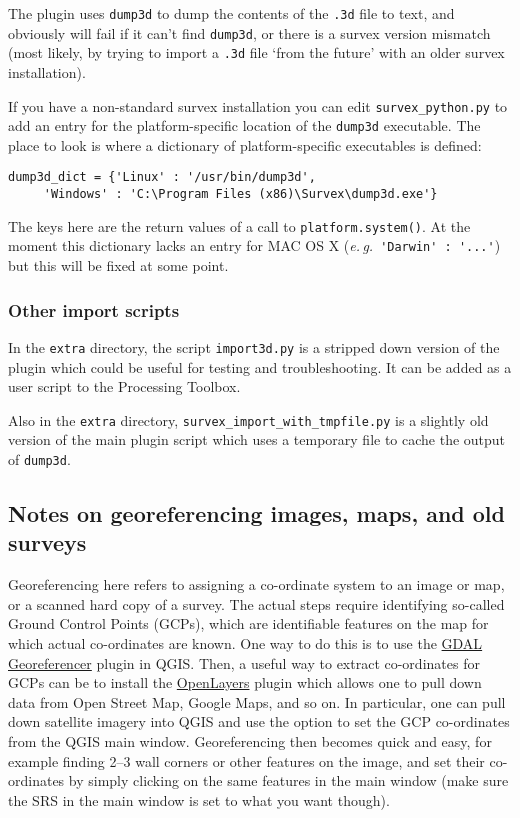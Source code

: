 \documentclass[]{article}
\newcommand{\latin}[1]{\emph{#1}}
\newcommand{\eg}{\latin{e.\,g.}}
\begin{document}
The plugin uses \verb}dump3d} to dump the contents of the \verb}.3d}
file to text, and obviously will fail if it can't find \verb}dump3d},
or there is a survex version mismatch (most likely, by trying to import
a \verb}.3d} file `from the future' with an older survex
installation).

If you have a non-standard survex installation you can edit
\verb}survex_python.py} to add an entry for the platform-specific
location of the \verb}dump3d} executable. The place to look is where a
dictionary of platform-specific executables is defined:

\begin{verbatim}
dump3d_dict = {'Linux' : '/usr/bin/dump3d',
     'Windows' : 'C:\Program Files (x86)\Survex\dump3d.exe'}
\end{verbatim}

The keys here are the return values of a call to
\verb}platform.system()}. At the moment this dictionary lacks an entry
for MAC OS X (\eg\ \verb+'Darwin' : '...'+)
but this will be fixed at some point.

\subsubsection{Other import scripts}\label{other-import-scripts}

In the \verb}extra} directory, the script \verb}import3d.py} is a
stripped down version of the plugin which could be useful for testing
and troubleshooting. It can be added as a user script to the Processing
Toolbox.

Also in the \verb}extra} directory,
\verb}survex_import_with_tmpfile.py} is a slightly old version of
the main plugin script which uses a temporary file to cache the output
of \verb}dump3d}.

\subsection{Notes on georeferencing images, maps, and old
surveys}\label{notes-on-georeferencing-images-maps-and-old-surveys}

Georeferencing here refers to assigning a co-ordinate system to an image
or map, or a scanned hard copy of a survey. The actual steps require
identifying so-called Ground Control Points (GCPs), which are
identifiable features on the map for which actual co-ordinates are
known. One way to do this is to use the
\href{https://docs.qgis.org/2.8/en/docs/user_manual/plugins/plugins_georeferencer.html}{GDAL
Georeferencer} plugin in QGIS. Then, a useful way to extract
co-ordinates for GCPs can be to install the
\href{https://plugins.qgis.org/plugins/openlayers_plugin/}{OpenLayers}
plugin which allows one to pull down data from Open Street Map, Google
Maps, and so on. In particular, one can pull down satellite imagery into
QGIS and use the option to set the GCP co-ordinates from the QGIS main
window. Georeferencing then becomes quick and easy, for example finding
2--3 wall corners or other features on the image, and set their
co-ordinates by simply clicking on the same features in the main window
(make sure the SRS in the main window is set to what you want though).
\end{document}
